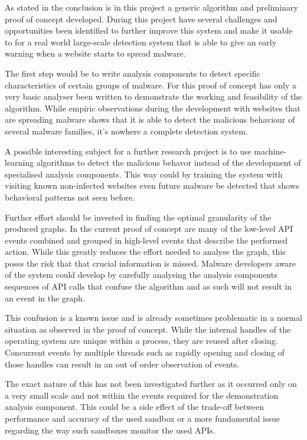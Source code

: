 As stated in the conclusion is in this project a generic algorithm and preliminary proof of concept developed. During this project have several challenges and opportunities been identified to further improve this system and make it usable to for a real world large-scale detection system that is able to give an early warning when a website starts to spread malware.

The first step would be to write analysis components to detect specific characteristics of certain groups of malware. For this proof of concept has only a very basic analyser been written to demonstrate the working and feasibility of the algorithm. While empiric observations during the development with websites that are spreading malware shows that it is able to detect the malicious behaviour of several malware families, it's nowhere a complete detection system.

A possible interesting subject for a further research project is to use machine-learning algorithms to detect the malicious behavor instead of the development of specialised analysis components. This way could by training the system with visiting known non-infected websites even future malware be detected that shows behavioral patterns not seen before.

Further effort should be invested in finding the optimal granularity of the produced graphs. In the current proof of concept are many of the low-level API events combined and grouped in high-level events that describe the performed action. While this greatly reduces the effort needed to analyse the graph, this poses the risk that that crucial information is missed. Malware developers aware of the system could develop by carefully analysing the analysis components sequences of API calls that confuse the algorithm and as such will not result in an event in the graph.

This confusion is a known issue and is already sometimes problematic in a normal situation as observed in the proof of concept. While the internal handles of the operating system are unique within a process, they are reused after closing. Concurrent events by multiple threads such as rapidly opening and closing of those handles can result in an out of order observation of events.

The exact nature of this has not been investigated further as it occurred only on a very small scale and not within the events required for the demonstration analysis component. This could be a side effect of the trade-off between performance and accuracy of the used sandbox or a more fundamental issue regarding the way such sandboxes monitor the used APIs.

